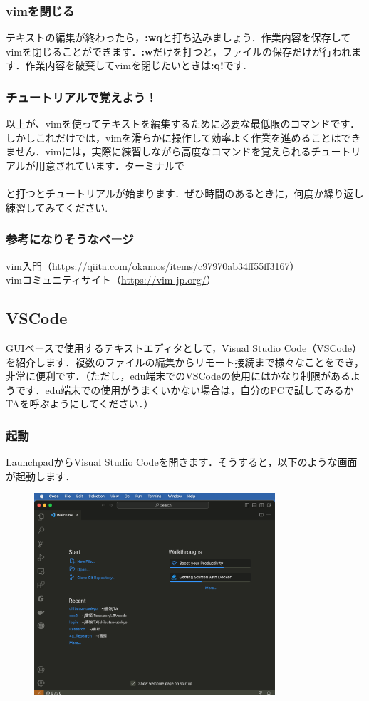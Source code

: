 \documentclass{jarticle}
\begin{document}
\subsubsection{vimを閉じる}
テキストの編集が終わったら，{\bf :wq}と打ち込みましょう．作業内容を保存してvimを閉じることができます．{\bf :w}だけを打つと，ファイルの保存だけが行われます．作業内容を破棄してvimを閉じたいときは{\bf :q!}です.\

\subsubsection{チュートリアルで覚えよう！}
以上が、vimを使ってテキストを編集するために必要な最低限のコマンドです．しかしこれだけでは，vimを滑らかに操作して効率よく作業を進めることはできません．vimには，実際に練習しながら高度なコマンドを覚えられるチュートリアルが用意されています．ターミナルで\ \\
\quad \quad {}\\
と打つとチュートリアルが始まります．ぜひ時間のあるときに，何度か繰り返し練習してみてください.\

\subsubsection{参考になりそうなページ}
\noindent
vim入門（\url{https://qiita.com/okamos/items/c97970ab34ff55ff3167}）\\
vimコミュニティサイト（\url{https://vim-jp.org/}）

\subsection{VSCode}
GUIベースで使用するテキストエディタとして，Visual Studio Code（VSCode）を紹介します．複数のファイルの編集からリモート接続まで様々なことをでき，非常に便利です．（ただし，edu端末でのVSCodeの使用にはかなり制限があるようです．edu端末での使用がうまくいかない場合は，自分のPCで試してみるかTAを呼ぶようにしてください．）

\subsubsection{起動}
LaunchpadからVisual Studio Codeを開きます．そうすると，以下のような画面が起動します．
\begin{figure}[H]
  \centering
  \includegraphics[height=7.5cm]{fig/VSCode1.png}
\end{figure}
\end{document}
